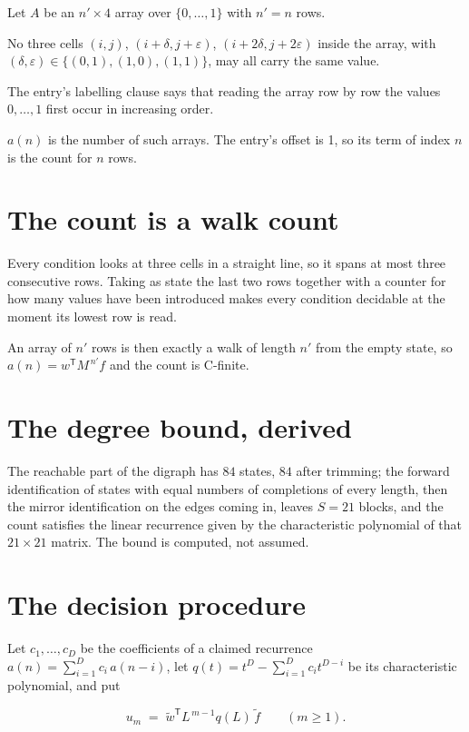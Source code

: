 \documentclass[11pt]{article}
\theoremstyle{definition}
\begin{document}
Let $A$ be an $n' \times 4$ array over $\{0,\dots,1\}$ with $n' = n$ rows.

No three cells $(i,j)$, $(i{+}\delta,j{+}\varepsilon)$, $(i{+}2\delta,j{+}2\varepsilon)$ inside the array, with $(\delta,\varepsilon) \in \{(0,1), (1,0), (1,1)\}$, may all carry the same value.

The entry's labelling clause says that reading the array row by row the values $0,\dots,1$ first occur in increasing order.

$a(n)$ is the number of such arrays. The entry's offset is 1, so its term of index $n$ is the count for $n$ rows.

\section{The count is a walk count}

Every condition looks at three cells in a straight line, so it spans at most three consecutive rows. Taking as state the last two rows together with a counter for how many values have been introduced makes every condition decidable at the moment its lowest row is read.

An array of $n'$ rows is then exactly a walk of length $n'$ from the empty state, so $a(n) = w^{\mathsf T}M^{\,n'}f$ and the count is C-finite.

\section{The degree bound, derived}

The reachable part of the digraph has $84$ states, $84$ after trimming; the forward identification of states with equal numbers of completions of every length, then the mirror identification on the edges coming in, leaves $S = 21$ blocks, and the count satisfies the linear recurrence given by the characteristic polynomial of that $21\times21$ matrix. The bound is computed, not assumed.

\section{The decision procedure}

Let $c_1,\dots,c_D$ be the coefficients of a claimed recurrence $a(n) = \sum_{i=1}^{D} c_i\,a(n-i)$, let $q(t) = t^{D} - \sum_{i=1}^{D} c_i t^{D-i}$ be its characteristic polynomial, and put

\[u_m \;=\; \tilde w^{\mathsf T} L^{\,m-1} q(L)\,\tilde f \qquad (m \ge 1).\]
\end{document}
